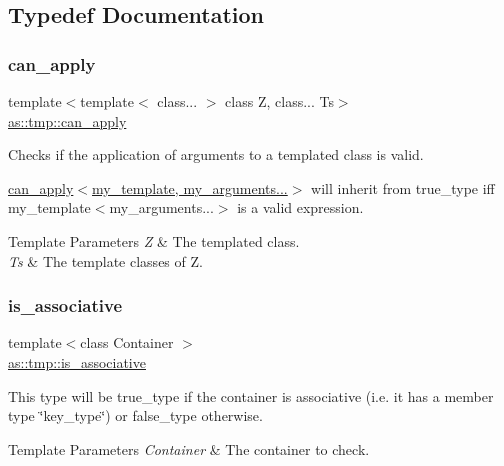 \subsection{Typedef Documentation}
\mbox{\label{namespaceas_1_1tmp_a44a275bd3c66d727fb1b6f0179d49e19}} 
\subsubsection{\texorpdfstring{can\+\_\+apply}{can\_apply}}
{\footnotesize\ttfamily template$<$template$<$ class... $>$ class Z, class... Ts$>$ \\
\hyperlink{namespaceas_1_1tmp_a44a275bd3c66d727fb1b6f0179d49e19}{as\+::tmp\+::can\+\_\+apply}}



Checks if the application of arguments to a templated class is valid. 

\hyperlink{namespaceas_1_1tmp_a44a275bd3c66d727fb1b6f0179d49e19}{can\+\_\+apply$<$my\+\_\+template, my\+\_\+arguments...$>$} will inherit from true\+\_\+type iff my\+\_\+template$<$my\+\_\+arguments...$>$ is a valid expression.


\begin{DoxyTemplParams}{Template Parameters}
{\em Z} & The templated class. \\
\hline
{\em Ts} & The template classes of {\ttfamily Z}. \\
\hline
\end{DoxyTemplParams}
\mbox{\label{namespaceas_1_1tmp_a893659f8b2cd22837c8f494a6f4a61d9}} 
\subsubsection{\texorpdfstring{is\+\_\+associative}{is\_associative}}
{\footnotesize\ttfamily template$<$class Container $>$ \\
\hyperlink{namespaceas_1_1tmp_a893659f8b2cd22837c8f494a6f4a61d9}{as\+::tmp\+::is\+\_\+associative}}



This type will be true\+\_\+type if the container is associative (i.\+e. it has a member type \char`\"{}key\+\_\+type\char`\"{}) or false\+\_\+type otherwise. 


\begin{DoxyTemplParams}{Template Parameters}
{\em Container} & The container to check. \\
\hline
\end{DoxyTemplParams}
